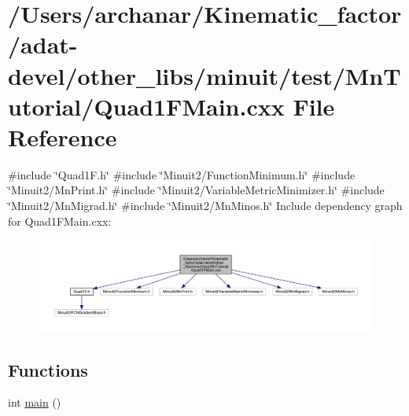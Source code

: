\hypertarget{adat-devel_2other__libs_2minuit_2test_2MnTutorial_2Quad1FMain_8cxx}{}\section{/\+Users/archanar/\+Kinematic\+\_\+factor/adat-\/devel/other\+\_\+libs/minuit/test/\+Mn\+Tutorial/\+Quad1\+F\+Main.cxx File Reference}
\label{adat-devel_2other__libs_2minuit_2test_2MnTutorial_2Quad1FMain_8cxx}
{\ttfamily \#include \char`\"{}Quad1\+F.\+h\char`\"{}}\newline
{\ttfamily \#include \char`\"{}Minuit2/\+Function\+Minimum.\+h\char`\"{}}\newline
{\ttfamily \#include \char`\"{}Minuit2/\+Mn\+Print.\+h\char`\"{}}\newline
{\ttfamily \#include \char`\"{}Minuit2/\+Variable\+Metric\+Minimizer.\+h\char`\"{}}\newline
{\ttfamily \#include \char`\"{}Minuit2/\+Mn\+Migrad.\+h\char`\"{}}\newline
{\ttfamily \#include \char`\"{}Minuit2/\+Mn\+Minos.\+h\char`\"{}}\newline
Include dependency graph for Quad1\+F\+Main.\+cxx\+:
\nopagebreak
\begin{figure}[H]
\begin{center}
\leavevmode
\includegraphics[width=350pt]{d7/d4a/adat-devel_2other__libs_2minuit_2test_2MnTutorial_2Quad1FMain_8cxx__incl}
\end{center}
\end{figure}
\subsection*{Functions}
\begin{DoxyCompactItemize}
\item 
int \mbox{\hyperlink{adat-devel_2other__libs_2minuit_2test_2MnTutorial_2Quad1FMain_8cxx_ae66f6b31b5ad750f1fe042a706a4e3d4}{main}} ()
\end{DoxyCompactItemize}


